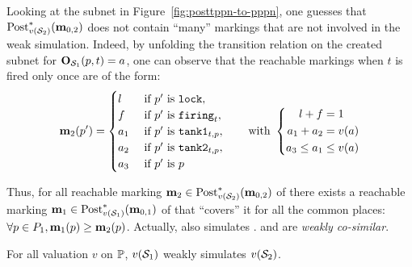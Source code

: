 Looking at the subnet in Figure~\ref{fig:posttppn-to-pppn},
one guesses that $\posts[\val({\namePPN[2]})]{\mar_{0,2}}$ does not contain “many” markings that are not involved in the weak simulation.
Indeed, by unfolding the transition relation on the created subnet for $\outm[\namePPN[1]][p,t] = a$, one can observe that the reachable markings when $t$ is fired only once are of the form:
\begin{align}
  \label{eqn:widget-reachable-markings}
  \mar_2(p') =
  \begin{cases}
    l   &\text{ if } p' \text{ is } \mathtt{lock}, \\
    f   &\text{ if } p' \text{ is } \mathtt{firing}_t, \\
    a_1 &\text{ if } p' \text{ is } \mathtt{tank1}_{t,p}, \\
    a_2 &\text{ if } p' \text{ is } \mathtt{tank2}_{t,p}, \\
    a_3 &\text{ if } p' \text{ is } p
  \end{cases}
  \text{\qquad with }
  \left\{
    \begin{aligned}
      l + f &= 1 \\
      a_1 + a_2 &= \val[a] \\
      a_3 \leq a_1 &\leq \val[a]
    \end{aligned}
  \right.
\end{align}

Thus, for all reachable marking $\mar_2 \in \Post^*_{v(\namePPN[2])}(\mar_{0,2})$ of \namePPN[2] there exists a reachable marking $\mar_1 \in \Post^*_{v(\namePPN[1])}(\mar_{0,1})$ of \namePPN[1] that ``covers'' it for all the common places: $\forall p \in \places_1, \mar_1(p) \geq \mar_2(p)$.
Actually, \namePPN[1] also simulates \namePPN[2].
\namePPN[1] and \namePPN[2] are \emph{weakly co-similar}.

\begin{lemm}
  \label{theo:simulation-postt-ppn-p-ppn}
  For all valuation $v$ on $\parameters$, $v(\namePPN[1])$ weakly simulates $v(\namePPN[2])$.
\end{lemm}

